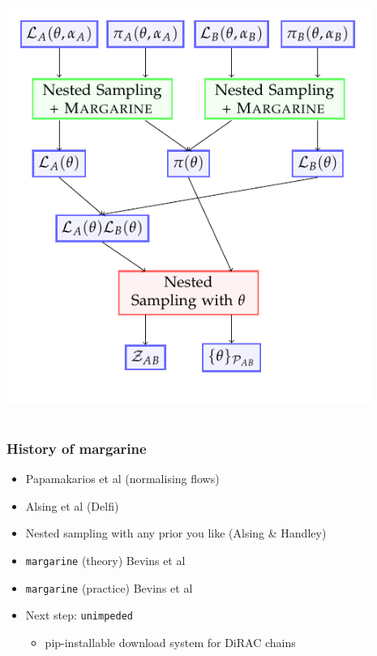 \documentclass[aspectratio=169]{beamer}
\begin{document}
\begin{frame}
\begin{columns}
        \includegraphics[width=0.9\textwidth]{figures/quick_margarine.pdf}
        
    \end{columns}
\end{frame}

\begin{frame}
    \frametitle{History of margarine}
    \begin{itemize}
        \item Papamakarios et al  (normalising flows)
        \item Alsing et al  (Delfi)
        \item Nested sampling with any prior you like (Alsing \& Handley) 
        \item \texttt{margarine} (theory) Bevins et al 
        \item \texttt{margarine} (practice) Bevins et al 
        \item Next step: \texttt{unimpeded}
            \begin{itemize}
                \item pip-installable download system for DiRAC chains
            \end{itemize}
    \end{itemize}

\end{frame}
\end{document}
